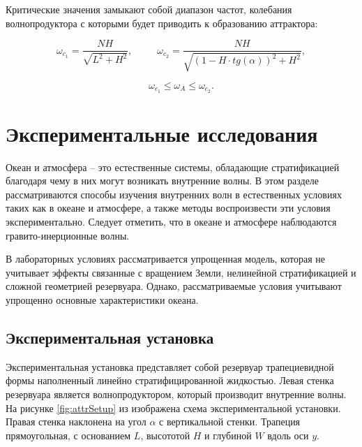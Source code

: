 Критические значения замыкают собой диапазон частот, колебания волнопродуктора с которыми будет приводить к образованию аттрактора:

\begin{equation}
    \omega_{c_{1}}=\frac{NH}{\sqrt{L^2+H^2}}, \;\;\;\;\;\;\;\;\; \omega_{c_{2}} = \frac{NH}{\sqrt{\left( 1-H\cdot tg(\alpha) \right)^2+H^2}},
\end{equation}


\begin{equation}
    \omega_{c_{1}} \leq \omega_A \leq \omega_{c_{2}}.
\end{equation}


\section{Экспериментальные исследования}

Океан и атмосфера -- это естественные системы, обладающие стратификацией благодаря чему в них могут возникать внутренние волны. В этом разделе рассматриваются способы изучения внутренних волн в естественных условиях таких как в океане и атмосфере, а также методы воспроизвести эти условия экспериментально. Следует отметить, что в океане и атмосфере наблюдаются гравито-инерционные волны.

В лабораторных условиях рассматривается упрощенная модель, которая не учитывает эффекты связанные с вращением Земли, нелинейной стратификацией и сложной геометрией резервуара. Однако, рассматриваемые условия учитывают упрощенно основные характеристики океана. 

\subsection{Экспериментальная установка}

Экспериментальная установка представляет собой резервуар трапециевидной формы наполненный линейно стратифицированной жидкостью. Левая стенка резервуара является волнопродуктором, который производит внутренние волны. На рисунке \ref{fig:attrSetup} из \cite{Brouzet2016} изображена схема экспериментальной установки. Правая стенка наклонена на угол $\alpha$ с вертикальной стенки. Трапеция прямоугольная, с основанием $L$, высототой $H$ и глубиной $W$ вдоль оси $y$. 

